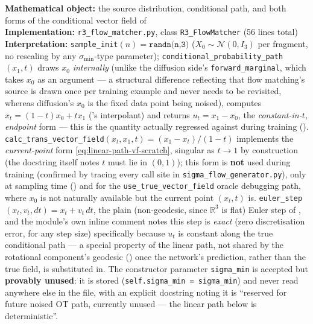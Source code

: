 \documentclass[11pt,a4paper]{report}
\theoremstyle{definition}
\theoremstyle{remark}
\newcommand{\RR}{\mathbb R}
\newcommand{\file}[1]{\texttt{#1}}
\newcommand{\pyfunc}[1]{\texttt{#1}}
\begin{document}
\begin{codebox}
\textbf{Mathematical object:} the source distribution, conditional path,
and both forms of the conditional vector field of
 \\
\textbf{Implementation:} \file{r3\_flow\_matcher.py}, class
\pyfunc{R3\_FlowMatcher} (56 lines total) \\
\textbf{Interpretation:}
\pyfunc{sample\_init}$(n)=\texttt{randn(n,3)}$ ($X_0\sim\mathcal N(0,I_3)$
per fragment, no rescaling by any $\sigma_{\min}$-type parameter);
\pyfunc{conditional\_probability\_path}$(x_1,t)$ draws $x_0$
\emph{internally} (unlike the diffusion side's
\pyfunc{forward\_marginal}, which takes $x_0$ as an argument --- a
structural difference reflecting that flow matching's source is drawn once
per training example and never needs to be revisited, whereas diffusion's
$x_0$ is the fixed data point being noised), computes
$x_t=(1-t)x_0+tx_1$ ('s interpolant) and
returns $u_t=x_1-x_0$, the \emph{constant-in-$t$, endpoint} form --- this
is the quantity actually regressed against during training
(). \pyfunc{calc\_trans\_vector\_field}$(x_t,x_1,t)=(x_1-x_t)/(1-t)$
implements the \emph{current-point} form
\eqref{eq:linear-path-vf-scratch}, singular as $t\to1$ by construction
(the docstring itself notes $t$ must lie in $(0,1)$); this form is
\textbf{not} used during training (confirmed by tracing every call site in
\file{sigma\_flow\_generator.py}), only at sampling time
() and for the \texttt{use\_true\_vector\_field}
oracle debugging path, where $x_0$ is not naturally available but the
current point $(x_t,t)$ is. \pyfunc{euler\_step}$(x_t,v_t,dt)=x_t+v_t\,dt$,
the plain (non-geodesic, since $\RR^3$ is flat) Euler step of
, and the module's own inline comment notes
this step is \emph{exact} (zero discretisation error, for any step size)
specifically because $u_t$ is constant along the true conditional path ---
a special property of the linear path, not shared by the rotational
component's geodesic () once the network's
prediction, rather than the true field, is substituted in. The constructor
parameter \texttt{sigma\_min} is accepted but \textbf{provably unused}: it
is stored (\texttt{self.sigma\_min = sigma\_min}) and never read anywhere
else in the file, with an explicit docstring noting it is ``reserved for
future noised OT path, currently unused --- the linear path below is
deterministic''.
\end{codebox}
\end{document}

